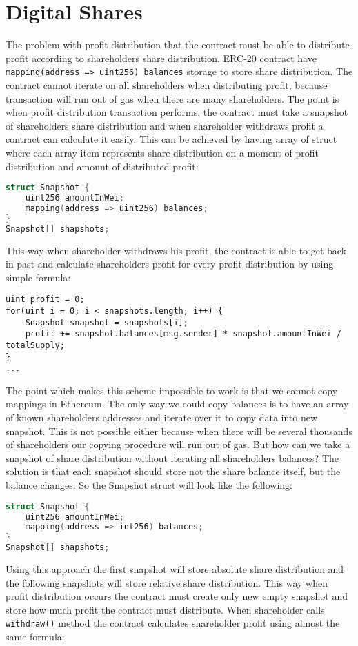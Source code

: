 \documentclass[onecolumn]{article}
\begin{document}
\section{Digital Shares}
The problem with profit distribution that the contract must be able to distribute profit according to shareholders share distribution. ERC-20 contract have \lstinline{mapping(address => uint256) balances} storage to store share distribution. The contract cannot iterate on all shareholders when distributing profit, because transaction will run out of gas when there are many shareholders. The point is when profit distribution transaction performs, the contract must take a snapshot of shareholders share distribution and when shareholder withdraws profit a contract can calculate it easily. This can be achieved by having array of struct where each array item represents share distribution on a moment of profit distribution and amount of distributed profit:
\begin{lstlisting}[language=C]
struct Snapshot {
	uint256 amountInWei;
	mapping(address => uint256) balances;
}
Snapshot[] shapshots;
\end{lstlisting}
This way when shareholder withdraws his profit, the contract is able to get back in past and calculate shareholders profit for every profit distribution by using simple formula:
\begin{lstlisting}
uint profit = 0;
for(uint i = 0; i < snapshots.length; i++) {
	Snapshot snapshot = snapshots[i];
	profit += snapshot.balances[msg.sender] * snapshot.amountInWei / totalSupply;
}
...
\end{lstlisting}
The point which makes this scheme impossible to work is that we cannot copy mappings in Ethereum. The only way we could copy balances is to have an array of known shareholders addresses and iterate over it to copy data into new snapshot. This is not possible either because when there will be several thousands of shareholders our copying procedure will run out of gas. But how can we take a snapshot of share distribution without iterating all shareholders balances? The solution is that each snapshot should store not the share balance itself, but the balance changes. So the Snapshot struct will look like the following:
\begin{lstlisting}[language=C]
struct Snapshot {
	uint256 amountInWei;
	mapping(address => int256) balances;
}
Snapshot[] shapshots;
\end{lstlisting}
Using this approach the first snapshot will store absolute share distribution and the following snapshots will store relative share distribution. This way when profit distribution occurs the contract must create only new empty snapshot and store how much profit the contract must distribute. When shareholder calls \lstinline{withdraw()} method the contract calculates shareholder profit using almost the same formula:
\end{document}

